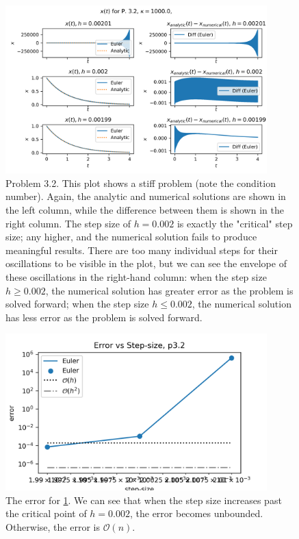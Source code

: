 \documentclass[10pt,letterpaper,notitlepage]{article}
\begin{document}
    \begin{figure}[h]
        \centering
        \includegraphics[width=0.9\textwidth]{../figures/p32.png}
        \caption{Problem 3.2. This plot shows a stiff problem (note the condition number). Again, the analytic and numerical solutions are shown in the left column, while the difference between them is shown in the right column. The step size of $h=0.002$ is exactly the "critical" step size; any higher, and the numerical solution fails to produce meaningful results. There are too many individual steps for their oscillations to be visible in the plot, but we can see the envelope of these oscillations in the right-hand column: when the step size $h\geq 0.002$, the numerical solution has greater error as the problem is solved forward; when the step size $h\leq 0.002$, the numerical solution has less error as the problem is solved forward.}
        \label{fig:problem32}
    \end{figure}
    \begin{figure}[h]
        \centering
        \includegraphics[width=0.9\textwidth]{../figures/p32err.png}
        \caption{The error for \cref{fig:problem32}. We can see that when the step size increases past the critical point of $h=0.002$, the error becomes unbounded. Otherwise, the error is $\mathcal{O}(n)$.}
        \label{fig:problem32err}
    \end{figure}
\end{document}
